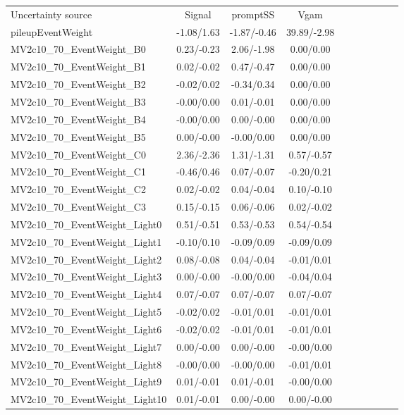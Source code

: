 \begin{table}[h]
\scriptsize
\begin{center}
\begin{tabular}{l|ccccccccc}
\hline
\hline
Uncertainty source &Signal &promptSS &Vgam \\
pileupEventWeight &-1.08/1.63 &-1.87/-0.46 &39.89/-2.98 \\
MV2c10\_70\_EventWeight\_B0 &0.23/-0.23 &2.06/-1.98 &0.00/0.00 \\
MV2c10\_70\_EventWeight\_B1 &0.02/-0.02 &0.47/-0.47 &0.00/0.00 \\
MV2c10\_70\_EventWeight\_B2 &-0.02/0.02 &-0.34/0.34 &0.00/0.00 \\
MV2c10\_70\_EventWeight\_B3 &-0.00/0.00 &0.01/-0.01 &0.00/0.00 \\
MV2c10\_70\_EventWeight\_B4 &-0.00/0.00 &0.00/-0.00 &0.00/0.00 \\
MV2c10\_70\_EventWeight\_B5 &0.00/-0.00 &-0.00/0.00 &0.00/0.00 \\
MV2c10\_70\_EventWeight\_C0 &2.36/-2.36 &1.31/-1.31 &0.57/-0.57 \\
MV2c10\_70\_EventWeight\_C1 &-0.46/0.46 &0.07/-0.07 &-0.20/0.21 \\
MV2c10\_70\_EventWeight\_C2 &0.02/-0.02 &0.04/-0.04 &0.10/-0.10 \\
MV2c10\_70\_EventWeight\_C3 &0.15/-0.15 &0.06/-0.06 &0.02/-0.02 \\
MV2c10\_70\_EventWeight\_Light0 &0.51/-0.51 &0.53/-0.53 &0.54/-0.54 \\
MV2c10\_70\_EventWeight\_Light1 &-0.10/0.10 &-0.09/0.09 &-0.09/0.09 \\
MV2c10\_70\_EventWeight\_Light2 &0.08/-0.08 &0.04/-0.04 &-0.01/0.01 \\
MV2c10\_70\_EventWeight\_Light3 &0.00/-0.00 &-0.00/0.00 &-0.04/0.04 \\
MV2c10\_70\_EventWeight\_Light4 &0.07/-0.07 &0.07/-0.07 &0.07/-0.07 \\
MV2c10\_70\_EventWeight\_Light5 &-0.02/0.02 &-0.01/0.01 &-0.01/0.01 \\
MV2c10\_70\_EventWeight\_Light6 &-0.02/0.02 &-0.01/0.01 &-0.01/0.01 \\
MV2c10\_70\_EventWeight\_Light7 &0.00/-0.00 &0.00/-0.00 &-0.00/0.00 \\
MV2c10\_70\_EventWeight\_Light8 &-0.00/0.00 &-0.00/0.00 &-0.01/0.01 \\
MV2c10\_70\_EventWeight\_Light9 &0.01/-0.01 &0.01/-0.01 &-0.00/0.00 \\
MV2c10\_70\_EventWeight\_Light10 &0.01/-0.01 &0.00/-0.00 &0.00/-0.00 \\

\end{tabular}
\end{center}
\end{table}
